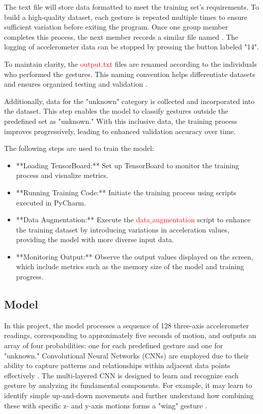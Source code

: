 The text file will store data formatted to meet the training set's requirements. To build a high-quality dataset, each gesture is repeated multiple times to ensure sufficient variation before exiting the program. Once one group member completes this process, the next member records a similar file named . The logging of accelerometer data can be stopped by pressing the button labeled "14".  

To maintain clarity, the \textcolor{red}{output.txt} files are renamed according to the individuals who performed the gestures. This naming convention helps differentiate datasets and ensures organized testing and validation \cite{Warden:2020}.  

Additionally, data for the "unknown" category is collected and incorporated into the dataset. This step enables the model to classify gestures outside the predefined set as "unknown." With this inclusive data, the training process improves progressively, leading to enhanced validation accuracy over time.  

The following steps are used to train the model:  

\begin{itemize}  
	\item **Loading TensorBoard:** Set up TensorBoard to monitor the training process and visualize metrics.  
	\item **Running Training Code:** Initiate the training process using scripts executed in PyCharm.  
	\item **Data Augmentation:** Execute the \textcolor{red}{data$\_$augmentation} script to enhance the training dataset by introducing variations in acceleration values, providing the model with more diverse input data.  
	\item **Monitoring Output:** Observe the output values displayed on the screen, which include metrics such as the memory size of the model and training progress.  
\end{itemize}  

\subsection{Model}

In this project, the model processes a sequence of 128 three-axis accelerometer readings, corresponding to approximately five seconds of motion, and outputs an array of four probabilities: one for each predefined gesture and one for "unknown." Convolutional Neural Networks (CNNs) are employed due to their ability to capture patterns and relationships within adjacent data points effectively \cite{Warden:2020}. The multi-layered CNN is designed to learn and recognize each gesture by analyzing its fundamental components. For example, it may learn to identify simple up-and-down movements and further understand how combining these with specific z- and y-axis motions forms a "wing" gesture \cite{Warden:2020}.  

